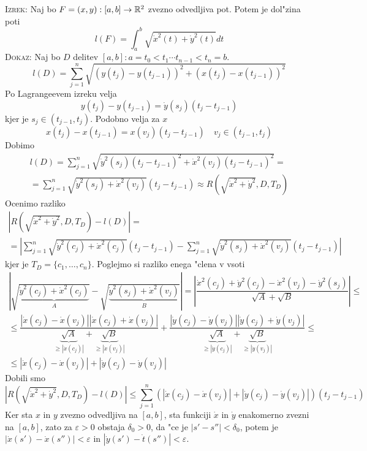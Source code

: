 \textsc{Izrek:} Naj bo $F = (x, y): [a, b] \to \mathbb{R}^2$ zvezno odvedljiva pot. Potem je dol"zina poti
\begin{equation*}
l(F) = \int_a^b \sqrt{\dot{x}^2(t) + \dot{y}^2(t)} dt
\end{equation*}
\textsc{Dokaz:} Naj bo $D$ delitev $[a, b]: a = t_0 < t_1 \cdots t_{n-1} < t_n = b$.
\begin{equation*}
l(D) = \sum_{j=1}^{n} \sqrt{(y(t_j) - y(t_{j-1}))^2 + (x(t_j) - x(t_{j-1}))^2}
\end{equation*}
Po Lagrangeevem izreku velja
\begin{equation*}
y(t_j) - y(t_{j-1}) = \dot{y}(s_j) (t_j - t_{j-1})
\end{equation*}
kjer je $s_j \in (t_{j-1}, t_j)$. Podobno velja za $x$
\begin{equation*}
x(t_j) - x(t_{j-1}) = x(v_j) (t_j - t_{j-1}) \quad v_j \in (t_{j-1}, t_j)
\end{equation*}
Dobimo
\begin{multline*}
l(D) = \sum_{j=1}^n \sqrt{\dot{y}^2(s_j) (t_j-t_{j-1})^2 + \dot{x}^2(v_j) (t_j - t_{j-1})^2} = \\
= \sum_{j=1}^n \sqrt{\dot{y}^2(s_j) + \dot{x}^2(v_j)} (t_j - t_{j-1}) \approx R\left( \sqrt{\dot{x}^2 + \dot{y}^2}, D, T_D \right)
\end{multline*}
Ocenimo razliko
\begin{multline*}
\left| R\left( \sqrt{\dot{x}^2 + \dot{y}^2}, D, T_D \right) - l(D) \right| = \\
= \left| \sum_{j=1}^n \sqrt{\dot{y}^2(c_j) + \dot{x}^2(c_j)} (t_j - t_{j-1}) - \sum_{j=1}^n \sqrt{\dot{y}^2(s_j) + \dot{x}^2(v_j)} (t_j - t_{j-1}) \right|
\end{multline*}
kjer je $T_D = \{c_1, \ldots, c_n\}$. Poglejmo si razliko enega "clena v vsoti
\begin{multline*}
\left| \sqrt{\underbrace{\dot{y}^2(c_j) + \dot{x}^2(c_j)}_{A}} - \sqrt{\underbrace{\dot{y}^2(s_j) + \dot{x}^2(v_j)}_{B}} \right| = 
\left| \dfrac{\dot{x}^2(c_j) + \dot{y}^2(c_j) - \dot{x}^2(v_j) - \dot{y}^2(s_j)}{\sqrt{A} + \sqrt{B}} \right| \leq \\
\leq \dfrac{|\dot{x}(c_j) - \dot{x}(v_j)| |\dot{x}(c_j) + \dot{x}(v_j)|}{\underbrace{\sqrt{A}}_{\geq |\dot{x}(c_j)|} + \underbrace{\sqrt{B}}_{\geq |\dot{x}(v_j)|}} +
\dfrac{|\dot{y}(c_j) - \dot{y}(v_j)| |\dot{y}(c_j) + \dot{y}(v_j)|}{\underbrace{\sqrt{A}}_{\geq |\dot{y}(c_j)|} + \underbrace{\sqrt{B}}_{\geq |\dot{y}(v_j)|}} \leq \\
\leq |\dot{x}(c_j) - \dot{x}(v_j)| + |\dot{y}(c_j) - \dot{y}(v_j)|
\end{multline*}
Dobili smo
\begin{equation*}
\left| R\left( \sqrt{\dot{x}^2 + \dot{y}^2}, D, T_D \right) - l(D) \right| \leq \sum_{j=1}^n ( |\dot{x}(c_j) - \dot{x}(v_j)| + |\dot{y}(c_j) - \dot{y}(v_j)| )(t_j - t_{j-1})
\end{equation*}
Ker sta $x$ in $y$ zvezno odvedljiva na $[a, b]$, sta funkciji $\dot{x}$ in $\dot{y}$ enakomerno zvezni na $[a, b]$, zato za $\varepsilon >0$ obstaja $\delta_0 > 0$, da "ce je $|s' - s''| < \delta_0$, potem je $|\dot{x}(s') - \dot{x}(s'')| < \varepsilon$ in $|\dot{y}(s') - \dot{t}(s'')| < \varepsilon$.

